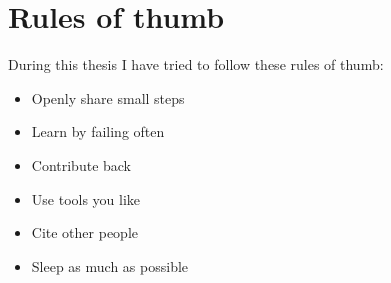 \chapter{Rules of thumb}

During this thesis I have tried to follow these rules of thumb:

\begin{itemize}
  \item Openly share small steps
  \item Learn by failing often
  \item Contribute back
  \item Use tools you like
  \item Cite other people
  \item Sleep as much as possible
\end{itemize}
